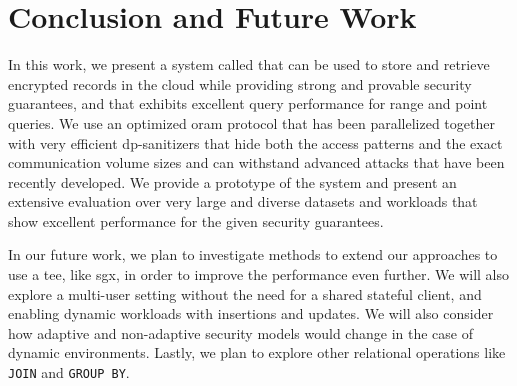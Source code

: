 \section{Conclusion and Future Work}

	In this work, we present a system called \epsolute{} that can be used to store and retrieve encrypted records in the cloud while providing strong and provable security guarantees, and that exhibits excellent query performance for range and point queries.
	We use an optimized \acrlong{oram} protocol that has been parallelized together with very efficient \acrshort{dp}-sanitizers that hide both the access patterns and the exact communication volume sizes and can withstand advanced attacks that have been recently developed.
	We provide a prototype of the system and present an extensive evaluation over very large and diverse datasets and workloads that show excellent performance for the given security guarantees.

	In our future work, we plan to investigate methods to extend our approaches to use a \acrfull{tee}, like \acrshort{sgx}, in order to improve the performance even further.
	We will also explore a multi-user setting without the need for a shared stateful client, and enabling dynamic workloads with insertions and updates.
	We will also consider how adaptive and non-adaptive security models would change in the case of dynamic environments.
	Lastly, we plan to explore other relational operations like \texttt{JOIN} and \texttt{GROUP BY}.
